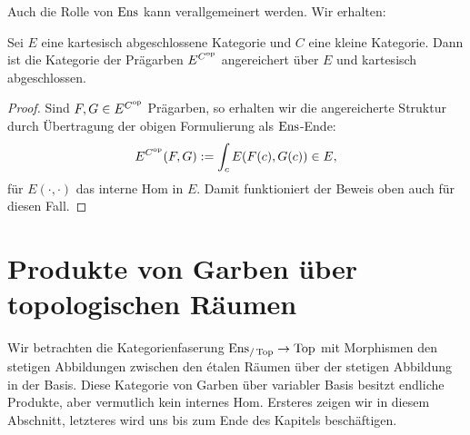 Auch die Rolle von $\operatorname{Ens}$ kann verallgemeinert werden. Wir erhalten:
\begin{prop} \label{presheaf-cart-closed}
  Sei $E$ eine kartesisch abgeschlossene Kategorie und $C$ eine kleine
  Kategorie. Dann ist die Kategorie der Prägarben $E^{C^\mathrm{op}}$
  angereichert über $E$ und kartesisch abgeschlossen.
\end{prop}
\begin{proof}
  Sind $F, G \in E^{C^\mathrm{op}}$ Prägarben, so erhalten wir die
  angereicherte Struktur durch Übertragung der obigen Formulierung als
  $\operatorname{Ens}$-Ende:
  \[ E^{C^\mathrm{op}}(F, G) := \int_c E(F(c), G(c)) \in E, \]
  für $E(\cdot, \cdot)$ das interne Hom in $E$. Damit funktioniert der
  Beweis oben auch für diesen Fall.
\end{proof}

\section[Produkte von Garben über topologischen Räumen]
        {Produkte von Garben über topologischen Räumen
          }

Wir betrachten die Kategorienfaserung $\operatorname{Ens}_{/\operatorname{Top}} \to \operatorname{Top}$ mit
Morphismen den stetigen Abbildungen zwischen den étalen Räumen über
der stetigen Abbildung in der Basis. Diese Kategorie von Garben über
variabler Basis besitzt endliche Produkte, aber vermutlich kein
internes Hom. Ersteres zeigen wir in diesem Abschnitt, letzteres wird
uns bis zum Ende des Kapitels beschäftigen.


